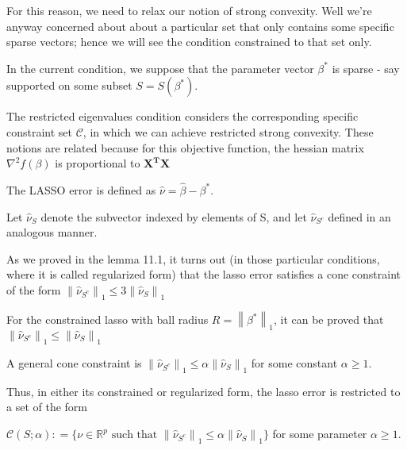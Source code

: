 \documentclass[fleqn, 11pt]{article}
\newcommand{\bs}[1]{\boldsymbol{#1}}
\newcommand\norm[1]{\left\lVert#1\right\rVert}
\begin{document}
\medskip

For this reason, we need to relax our notion of strong convexity. 
Well we're anyway concerned about about a particular set 
that only contains some specific sparse vectors; hence we will see the 
condition constrained to that set only. 

\smallskip

In the current condition, we suppose that the parameter vector $\beta^*$ is sparse - say supported on some 
subset $S=S(\beta^*)$. 

\smallskip

The restricted eigenvalues condition considers the corresponding
specific constraint set $\mathcal{C}$, in which we can achieve restricted strong convexity. 
These notions are related because for this objective function, the hessian matrix 
$\nabla^2 f(\beta) $   is proportional to  $ \bs{X^TX}$  

\medskip

The LASSO error is defined as $\hat{\nu} = \hat{\beta}- \beta^*$. 

\smallskip

Let $\hat{\nu}_S$ denote the subvector indexed by elements of S, and 
let $\hat{\nu}_{S^c}$ defined in an analogous manner.

\smallskip

As we proved in the lemma 11.1, it turns out (in those particular conditions, where it is called regularized form)
that the lasso error satisfies a cone constraint of the form
$\norm{\hat{\nu}_{S^c}}_1 \leq 3   \norm{\hat{\nu}_S}_1$ 

\medskip

For the constrained lasso with ball radius $R = \norm{\beta^*}_1$, 
it can be proved that $\norm{\hat{\nu}_{S^c}}_1 \leq  \norm{\hat{\nu}_S}_1$  

\medskip

A general cone constraint is $\norm{\hat{\nu}_{S^c}}_1 \leq  \alpha  \norm{\hat{\nu}_S}_1$  
for some constant $\alpha \geq 1$.

\medskip

Thus, in
either its constrained or regularized form, the lasso error is restricted to a set
of the form 


\begin{center}
    
$\mathcal{C}(S ; \alpha) : = \{ \nu \in \mathbb{R}^p \text{ such that } 
\norm{\hat{\nu}_{S^{c}}}_1 \leq \alpha \norm{\hat{\nu}_{S}}_1 \}$
for some parameter $\alpha \geq 1$. 

\end{center}
\end{document}
